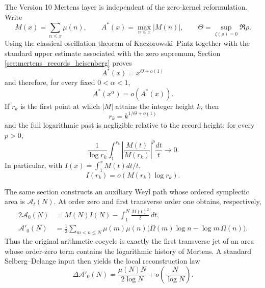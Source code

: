 \documentclass[11pt]{amsart}
\numberwithin{equation}{section}
\theoremstyle{plain}
\theoremstyle{definition}
\theoremstyle{remark}
\begin{document}
The Version 10 Mertens layer is independent of the zero-kernel reformulation.
Write
\begin{equation}
M(x)=\sum_{n\le x}\mu(n),
\qquad
A^*(x)=\max_{n\le x}|M(n)|,
\qquad
\Theta=\sup_{\zeta(\rho)=0}\Re\rho.
\label{eq:intro_record_definitions}
\end{equation}
Using the classical oscillation theorem of Kaczorowski--Pintz together with
the standard upper estimate associated with the zero supremum, Section
\ref{sec:mertens_records_heisenberg} proves
\begin{equation}
\boxed{A^*(x)=x^{\Theta+o(1)}}
\label{eq:intro_Astar_theta}
\end{equation}
and therefore, for every fixed \(0<\alpha<1\),
\begin{equation}
\boxed{A^*(x^\alpha)=o(A^*(x)).}
\label{eq:intro_scale_separation}
\end{equation}
If \(r_k\) is the first point at which \(|M|\) attains the integer height
\(k\), then
\begin{equation}
\boxed{r_k=k^{1/\Theta+o(1)}}
\label{eq:intro_record_time_law}
\end{equation}
and the full logarithmic past is negligible relative to the record height:
for every \(p>0\),
\begin{equation}
\boxed{
\frac1{\log r_k}\int_1^{r_k}
\left|\frac{M(t)}{M(r_k)}\right|^p\frac{dt}{t}\longrightarrow0.}
\label{eq:intro_record_Lp}
\end{equation}
In particular, with \(I(x)=\int_1^xM(t)dt/t\),
\begin{equation}
\boxed{I(r_k)=o(M(r_k)\log r_k).}
\label{eq:intro_record_integral}
\end{equation}

The same section constructs an auxiliary Weyl path whose ordered symplectic
area is \(\mathcal A_t(N)\).  At order zero and first transverse order one
obtains, respectively,
\begin{align}
2\mathcal A_0(N)
&=M(N)I(N)-\int_1^N\frac{M(t)^2}{t}\,dt,
\label{eq:intro_area_energy_identity}\\
\mathcal A'_0(N)
&=\frac12\sum_{m<n\le N}\mu(m)\mu(n)
\bigl(\Omega(m)\log n-\log m\,\Omega(n)\bigr).
\label{eq:intro_area_first_jet}
\end{align}
Thus the original arithmetic cocycle is exactly the first transverse jet of
an area whose order-zero term contains the logarithmic history of Mertens.
A standard Selberg--Delange input then yields the local reconstruction law
\begin{equation}
\boxed{
\Delta\mathcal A'_0(N)
=
\frac{\mu(N)N}{2\log N}+o\!\left(\frac{N}{\log N}\right).}
\label{eq:intro_first_jet_reconstruction}
\end{equation}
\end{document}
